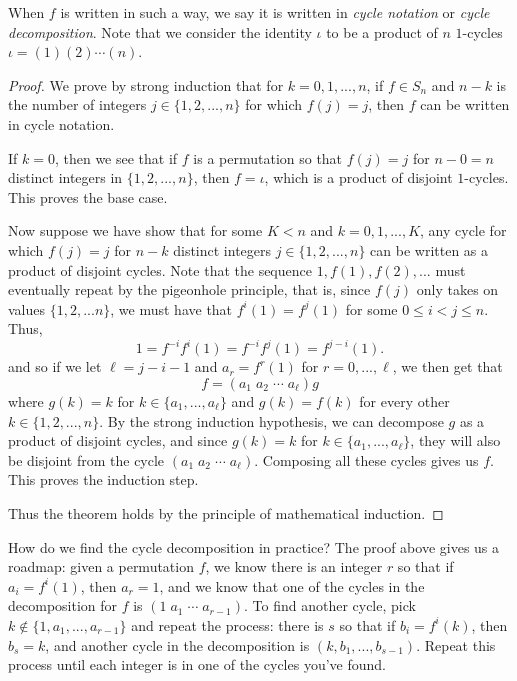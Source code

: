 \documentclass[11pt,dvipsnames]{book}
\numberwithin{equation}{section} %
\numberwithin{figure}{section} %
\numberwithin{table}{section} %
\begin{document}
When $f$ is written in such a way, we say it is written in {\it cycle notation} or {\it cycle decomposition}. Note that we consider the identity $\iota$ to be a product of $n$ $1$-cycles $\iota = (1)(2) \cdots (n)$. 

\begin{proof}
We prove by strong induction that for $k=0,1,...,n$, if $f\in S_n$ and $n-k$ is the number of integers $j\in \{1,2,...,n\}$ for which $f(j)=j$, then $f$ can be written in cycle notation. 

If $k=0$, then we see that if $f$ is a permutation so that $f(j)=j$ for $n-0=n$ distinct integers in $\{1,2,...,n\}$, then $f=\iota$, which is a product of disjoint $1$-cycles. This proves the base case. 

Now suppose we have show that for some $K<n$ and $k=0,1,...,K$, any cycle for which $f(j)=j$ for $n-k$ distinct integers $j\in \{1,2,...,n\}$ can be written as a product of disjoint cycles. Note that the sequence $1,f(1),f(2),...$ must eventually repeat by the pigeonhole principle, that is, since $f(j)$ only takes on values $\{1,2,...n\}$, we must have that $f^i(1)=f^j(1)$ for some $0\leq i<j\leq n$. Thus,
\[
1= f^{-i}f^{i}(1) = f^{-i}f^{j}(1) = f^{j-i}(1).
\]
and so if we let $\ell=j-i-1$ and $a_{r}=f^{r}(1)$ for $r=0,...,\ell$, we then get that 
\[
f=(a_{1}\; a_{2}\;\cdots \; a_{\ell}) g
\]
where $g(k)=k$ for $k\in \{a_{1},...,a_{\ell}\}$ and $g(k)=f(k)$ for every other $k\in \{1,2,...,n\}$. By the strong induction hypothesis, we can decompose $g$ as a product of disjoint cycles, and since $g(k)=k$ for $k\in \{a_{1},...,a_{\ell}\}$, they will also be disjoint from the cycle $(a_{1}\; a_{2}\;\cdots \; a_{\ell})$. Composing all these cycles gives us $f$. This proves the induction step.

Thus the theorem holds by the principle of mathematical induction.
\end{proof}


How do we find the cycle decomposition in practice? The proof above gives us a roadmap: given a permutation $f$, we know there is an integer $r$ so that if $a_{i}= f^{i}(1)$, then $a_{r}=1$, and we know that one of the cycles in the decomposition for $f$ is $(1 \; a_{1}\; \cdots \; a_{r-1})$. To find another cycle, pick $k\not\in \{1,a_{1},...,a_{r-1}\}$ and repeat the process: there is $s$ so that if $b_{i}=f^{i}(k)$, then $b_{s}=k$, and another cycle in the decomposition is $(k,b_{1},...,b_{s-1})$. Repeat this process until each integer is in one of the cycles you've found. 
\end{document}
